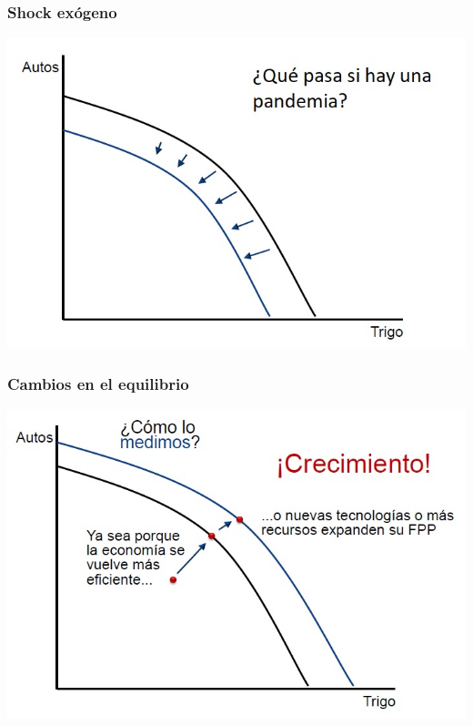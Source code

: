 \documentclass{beamer}
\begin{document}
\begin{frame}
\frametitle{Shock exógeno}
\begin{center}
    \includegraphics[scale=0.6]{../Tema_11.9_pandemia.jpg}
\end{center}
\end{frame}

\begin{frame}
\frametitle{Cambios en el equilibrio}
\begin{center}
    \includegraphics[scale=0.6]{../Tema_11.10_crecimiento.jpg}
\end{center}
\end{frame}
\end{document}
